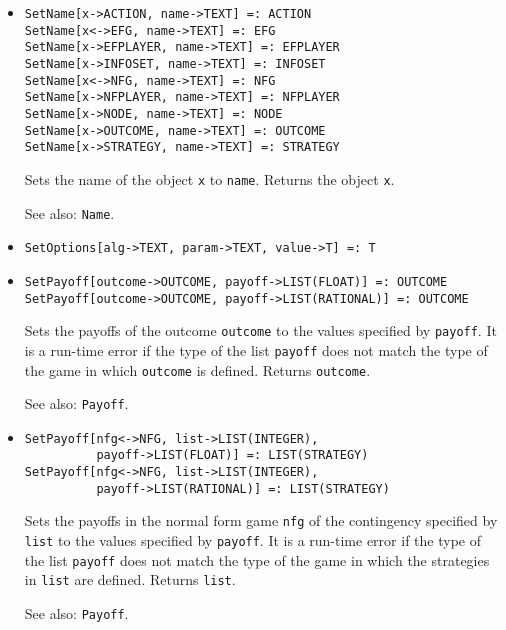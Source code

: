 \begin{itemize}
\item
\protect \large \begin{verbatim}
SetName[x->ACTION, name->TEXT] =: ACTION
SetName[x<->EFG, name->TEXT] =: EFG
SetName[x->EFPLAYER, name->TEXT] =: EFPLAYER
SetName[x->INFOSET, name->TEXT] =: INFOSET
SetName[x<->NFG, name->TEXT] =: NFG
SetName[x->NFPLAYER, name->TEXT] =: NFPLAYER
SetName[x->NODE, name->TEXT] =: NODE
SetName[x->OUTCOME, name->TEXT] =: OUTCOME
SetName[x->STRATEGY, name->TEXT] =: STRATEGY
\end{verbatim}\normalsize

\bd
Sets the name of the object \verb+x+ to \verb+name+.
Returns the object \verb+x+.
\item
[See also:] {\tt Name}.
\ed

\item
\protect \large \begin{verbatim}
SetOptions[alg->TEXT, param->TEXT, value->T] =: T
\end{verbatim}\normalsize

\item
\protect \large \begin{verbatim}
SetPayoff[outcome->OUTCOME, payoff->LIST(FLOAT)] =: OUTCOME
SetPayoff[outcome->OUTCOME, payoff->LIST(RATIONAL)] =: OUTCOME
\end{verbatim}\normalsize

\bd
Sets the payoffs of the outcome \verb+outcome+ to the
values specified by \verb+payoff+.  It is a run-time error if the type
of the list \verb+payoff+ does not match the type of the game in which
\verb+outcome+ is defined.  Returns \verb+outcome+.
\item
[See also:] {\tt Payoff}.
\ed

\item
\protect \large \begin{verbatim}
SetPayoff[nfg<->NFG, list->LIST(INTEGER),
          payoff->LIST(FLOAT)] =: LIST(STRATEGY)
SetPayoff[nfg<->NFG, list->LIST(INTEGER), 
          payoff->LIST(RATIONAL)] =: LIST(STRATEGY)
\end{verbatim}\normalsize

\bd
Sets the payoffs in the normal form game \verb+nfg+ of the
contingency specified by \verb+list+ to the values specified by
\verb+payoff+.  It is a run-time error if the type of the list
\verb+payoff+ does not match the type of the game in which the
strategies in \verb+list+ are defined.  Returns \verb+list+.
\item
[See also:] {\tt Payoff}.  
\ed


\end{itemize}
